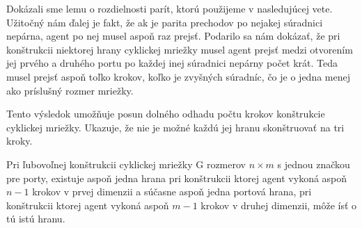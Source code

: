 Dokázali sme lemu o rozdielnosti parít, ktorú použijeme v nasledujúcej vete.
Užitočný nám ďalej je fakt, že ak je parita prechodov po nejakej súradnici
nepárna, agent po nej musel aspoň raz prejsť. Podarilo sa nám dokázať, že
pri konštrukcii niektorej hrany cyklickej mriežky musel agent prejsť medzi
otvorením jej prvého a druhého portu po každej inej súradnici nepárny počet
krát. Teda musel prejsť aspoň toľko krokov, koľko je zvyšných súradníc, čo
je o jedna menej ako príslušný rozmer mriežky.

Tento výsledok umožňuje posun dolného odhadu počtu krokov konštrukcie
cyklickej mriežky. Ukazuje, že nie je možné každú jej hranu skonštruovať na
tri kroky.

\begin{veta}
Pri ľubovoľnej konštrukcii cyklickej mriežky G rozmerov $n \times m$ 
s jednou značkou
pre porty, existuje aspoň jedna hrana pri konštrukcii ktorej agent vykoná 
aspoň $n - 1$ krokov v prvej dimenzii
a súčasne aspoň jedna portová hrana,
 pri konštrukcii ktorej agent vykoná aspoň $m - 1$ krokov v druhej dimenzii,
môže ísť o tú istú hranu.
\end{veta}
